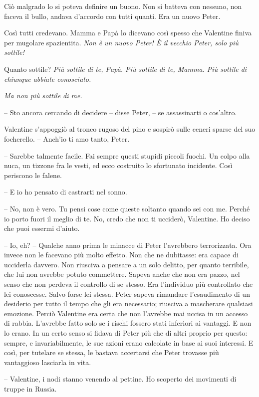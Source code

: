 {Ciò malgrado lo si poteva definire un buono. Non si batteva con
	nessuno, non faceva il bullo, andava d'accordo con tutti quanti. Era un
	nuovo Peter.}

{Così tutti credevano. Mamma e Papà lo dicevano così spesso che
	Valentine finiva per mugolare spazientita. \emph{Non è un nuovo Peter! È
		il vecchio Peter, solo più sottile!}}

{Quanto sottile? \emph{Più sottile di te, Papà. Più sottile di te,
		Mamma. Più sottile di chiunque abbiate conosciuto.}}

\emph{{Ma non più sottile di me.}}

{-- Sto ancora cercando di decidere -- disse Peter, -- se assassinarti o
	cos'altro.}

{Valentine s'appoggiò al tronco rugoso del pino e sospirò sulle ceneri
	sparse del suo focherello. -- Anch'io ti amo tanto, Peter.}

{-- Sarebbe talmente facile. Fai sempre questi stupidi piccoli fuochi.
	Un colpo alla nuca, un tizzone fra le vesti, ed ecco costruito lo
	sfortunato incidente. Così periscono le falene.}

{-- E io ho pensato di castrarti nel sonno.}

{-- No, non è vero. Tu pensi cose come queste soltanto quando sei con
	me. Perché io porto fuori il meglio di te. No, credo che non ti
	ucciderò, Valentine. Ho deciso che puoi essermi d'aiuto.}

{-- Io, eh? -- Qualche anno prima le minacce di Peter l'avrebbero
	terrorizzata. Ora invece non le facevano più molto effetto. Non che ne
	dubitasse: era capace di ucciderla davvero. Non riusciva a pensare a un
	solo delitto, per quanto terribile, che lui non avrebbe potuto
	commettere. Sapeva anche che non era pazzo, nel senso che non perdeva il
	controllo di se stesso. Era l'individuo più controllato che lei
	conoscesse. Salvo forse lei stessa. Peter sapeva rimandare l'esaudimento
	di un desiderio per tutto il tempo che gli era necessario; riusciva a
	mascherare qualsiasi emozione. Perciò Valentine era certa che non
	l'avrebbe mai uccisa in un accesso di rabbia. L'avrebbe fatto solo se i
	rischi fossero stati inferiori ai vantaggi. E non lo erano. In un certo
	senso si fidava di Peter più che di altri proprio per questo: sempre, e
	invariabilmente, le sue azioni erano calcolate in base ai suoi
	interessi. E così, per tutelare se stessa, le bastava accertarsi che
	Peter trovasse più vantaggioso lasciarla in vita.}

{-- Valentine, i nodi stanno venendo al pettine. Ho scoperto dei
	movimenti di truppe in Russia.}

